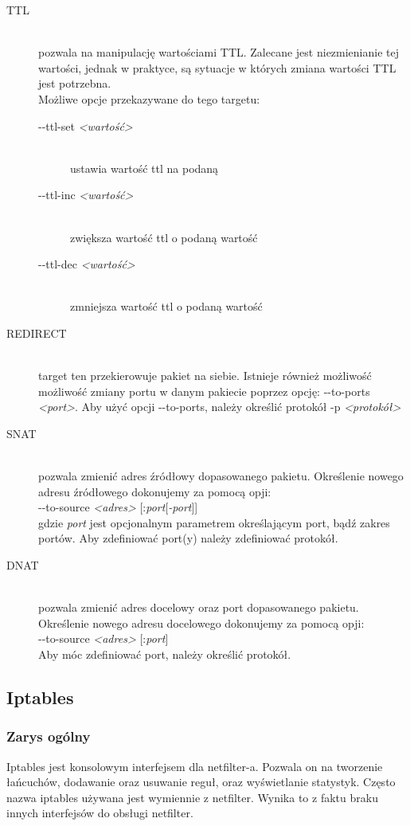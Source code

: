 \documentclass[a4paper,12pt]{book}
\newcommand{\param}[1]{\textit{\textless #1\textgreater}}
\begin{document}
\begin{description}
					\item[TTL] \hfill \\
						pozwala na manipulację wartościami TTL. Zalecane jest niezmienianie tej wartości, jednak w praktyce, są sytuacje w których zmiana wartości TTL jest potrzebna.\\
						Możliwe opcje przekazywane do tego targetu:
						\begin{description}
							\item[-{}-ttl-set \param{wartość}] \hfill \\
								ustawia wartość ttl na podaną
							\item[-{}-ttl-inc \param{wartość}] \hfill \\
								zwiększa wartość ttl o podaną wartość
							\item[-{}-ttl-dec \param{wartość}] \hfill \\
								zmniejsza wartość ttl o podaną wartość
						\end{description}
					\item[REDIRECT] \hfill \\
						target ten przekierowuje pakiet na siebie. Istnieje również możliwość możliwość zmiany portu w danym pakiecie poprzez opcję: -{}-to-ports \param{port}.
						Aby użyć opcji -{}-to-ports, należy określić protokół -p \param{protokół}
					\item[SNAT] \hfill \\
						pozwala zmienić adres źródłowy dopasowanego pakietu. Określenie nowego adresu źródłowego dokonujemy za pomocą opji:\\
						-{}-to-source \param{adres} [:\textit{port}[\textit{-port}]]\\
						gdzie \textit{port} jest opcjonalnym parametrem określającym port, bądź zakres portów. Aby zdefiniować port(y) należy zdefiniować protokół.
					\item[DNAT] \hfill \\
						pozwala zmienić adres docelowy oraz port dopasowanego pakietu. Określenie nowego adresu docelowego dokonujemy za pomocą opji:\\
						-{}-to-source \param{adres} [:\textit{port}]\\
						Aby móc zdefiniować port, należy określić protokół.
				\end{description}
	\subsection{Iptables}
		\subsubsection{Zarys ogólny}
			Iptables jest konsolowym interfejsem dla netfilter-a. Pozwala on na tworzenie łańcuchów, dodawanie oraz usuwanie reguł, oraz wyświetlanie statystyk.
			Często nazwa iptables używana jest wymiennie z netfilter. Wynika to z faktu braku innych interfejsów do obsługi netfilter.
\end{document}
